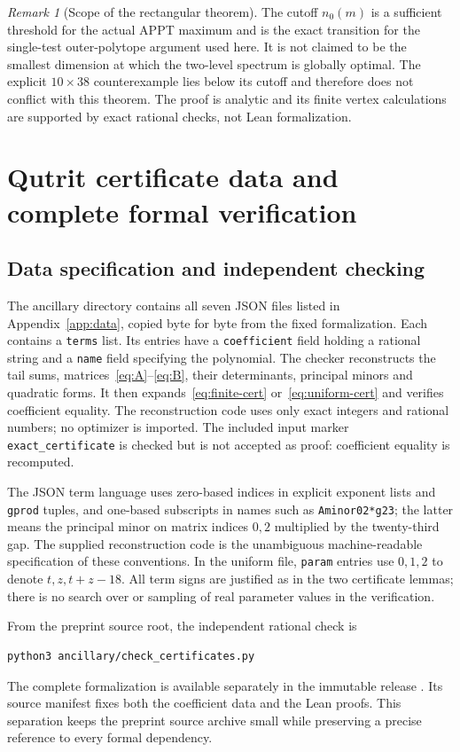 \documentclass[11pt]{article}
\theoremstyle{remark}\newtheorem{remark}[theorem]{Remark}
\begin{document}
\begin{remark}[Scope of the rectangular theorem]
The cutoff $n_0(m)$ is a sufficient threshold for the actual APPT maximum and is the exact transition for the single-test outer-polytope argument used here. It is not claimed to be the smallest dimension at which the two-level spectrum is globally optimal. The explicit $10\times38$ counterexample lies below its cutoff and therefore does not conflict with this theorem. The proof is analytic and its finite vertex calculations are supported by exact rational checks, not Lean formalization.
\end{remark}

\section{Qutrit certificate data and complete formal verification}\label{sec:verification}
\subsection{Data specification and independent checking}
The ancillary directory contains all seven JSON files listed in Appendix~\ref{app:data}, copied byte for byte from the fixed formalization. Each contains a \texttt{terms} list. Its entries have a \texttt{coefficient} field holding a rational string and a \texttt{name} field specifying the polynomial. The checker reconstructs the tail sums, matrices~\eqref{eq:A}--\eqref{eq:B}, their determinants, principal minors and quadratic forms. It then expands~\eqref{eq:finite-cert} or~\eqref{eq:uniform-cert} and verifies coefficient equality. The reconstruction code uses only exact integers and rational numbers; no optimizer is imported. The included input marker \texttt{exact\_certificate} is checked but is not accepted as proof: coefficient equality is recomputed.

The JSON term language uses zero-based indices in explicit exponent lists and \texttt{gprod} tuples, and one-based subscripts in names such as \texttt{Aminor02*g23}; the latter means the principal minor on matrix indices $0,2$ multiplied by the twenty-third gap. The supplied reconstruction code is the unambiguous machine-readable specification of these conventions. In the uniform file, \texttt{param} entries use $0,1,2$ to denote $t,z,t+z-18$. All term signs are justified as in the two certificate lemmas; there is no search over or sampling of real parameter values in the verification.

From the preprint source root, the independent rational check is
\begin{verbatim}
python3 ancillary/check_certificates.py
\end{verbatim}
The complete formalization is available separately in the immutable release \cite{ProofRelease}. Its source manifest fixes both the coefficient data and the Lean proofs. This separation keeps the preprint source archive small while preserving a precise reference to every formal dependency.
\end{document}
